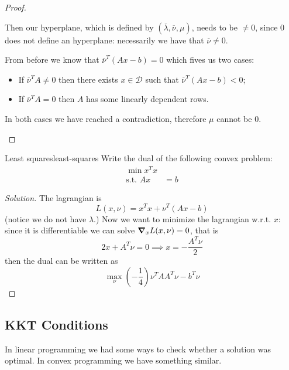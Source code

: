 \documentclass[12pt]{extarticle}
\begin{document}
\begin{proof}
\begin{enumerate}[label=\roman*.]
		      Then our hyperplane, which is defined by $(\overline \lambda, \overline \nu, \mu)$, needs
		      to be $\neq 0$, since $0$ does not define an hyperplane: necessarily we have that
		      $\overline \nu \neq 0$.

		      From before we know that $\overline \nu^T (Ax - b) = 0$ which fives us two cases:
		      \begin{itemize}
			      \item If $\overline \nu^T A \neq 0$ then there exists $x \in \mathcal D$ such that
			            $\overline \nu^T(Ax - b) < 0$;
			      \item If $\overline \nu^T A = 0$ then $A$ has some linearly dependent rows.
		      \end{itemize}
		      In both cases we have reached a contradiction, therefore $\mu$ cannot be $0$.
		      \qedhere
	\end{enumerate}
\end{proof}

\begin{example}{Least squares}{least-squares}
	Write the dual of the following convex problem:
	\begin{align}
		\min x^T x       &     \\
		\text{s.t. }	A x & = b
	\end{align}
\end{example}

\begin{proof}[Solution]
	The lagrangian is
	\begin{equation}
		L(x, \nu) = x^T x + \nu^T (Ax - b)
	\end{equation}
	(notice we do not have $\lambda$.)
	Now we want to minimize the lagrangian w.r.t. $x$: since it is differentiable we can solve
	$\grad_x L(x, \nu) = 0$, that is
	\begin{equation}
		2x + A^T \nu = 0 \implies x = - \frac{A^T \nu}{2}
	\end{equation}
	then the dual can be written as
	\begin{equation}
		\max_{\nu} \left(-\frac{1}{4}\right) \nu^T A A^T \nu - b^T \nu
	\end{equation}
\end{proof}

\subsection{KKT Conditions}
In linear programming we had some ways to check whether a solution was optimal.
In convex programming we have something similar.
\end{document}
